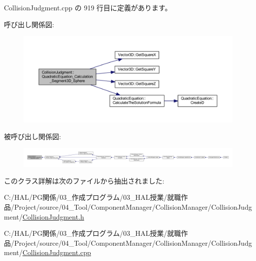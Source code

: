  Collision\+Judgment.\+cpp の 919 行目に定義があります。

呼び出し関係図\+:\nopagebreak
\begin{figure}[H]
\begin{center}
\leavevmode
\includegraphics[width=350pt]{class_collision_judgment_adf8acb73719d92f6b5dbd9a6989571ad_cgraph}
\end{center}
\end{figure}
被呼び出し関係図\+:
\nopagebreak
\begin{figure}[H]
\begin{center}
\leavevmode
\includegraphics[width=350pt]{class_collision_judgment_adf8acb73719d92f6b5dbd9a6989571ad_icgraph}
\end{center}
\end{figure}


このクラス詳解は次のファイルから抽出されました\+:\begin{DoxyCompactItemize}
\item 
C\+:/\+H\+A\+L/\+P\+G関係/03\+\_\+作成プログラム/03\+\_\+\+H\+A\+L授業/就職作品/\+Project/source/04\+\_\+\+Tool/\+Component\+Manager/\+Collision\+Manager/\+Collision\+Judgment/\mbox{\hyperlink{_collision_judgment_8h}{Collision\+Judgment.\+h}}\item 
C\+:/\+H\+A\+L/\+P\+G関係/03\+\_\+作成プログラム/03\+\_\+\+H\+A\+L授業/就職作品/\+Project/source/04\+\_\+\+Tool/\+Component\+Manager/\+Collision\+Manager/\+Collision\+Judgment/\mbox{\hyperlink{_collision_judgment_8cpp}{Collision\+Judgment.\+cpp}}\end{DoxyCompactItemize}
